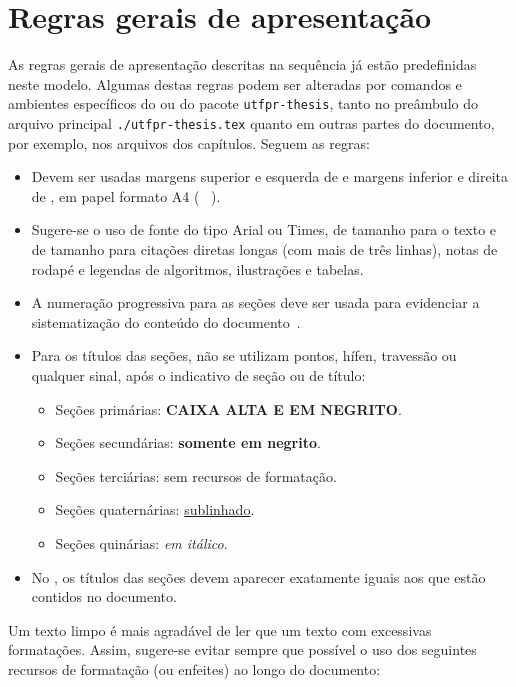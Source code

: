 \section{Regras gerais de apresentação}%
\label{sect:rules}

As regras gerais de apresentação descritas na sequência já estão predefinidas neste modelo.
Algumas destas regras podem ser alteradas por comandos e ambientes específicos do  ou do pacote \texttt{utfpr-thesis}, tanto no preâmbulo do arquivo principal \texttt{./utfpr-thesis.tex} quanto em outras partes do documento, por exemplo, nos arquivos dos capítulos\label{err:chpt-3}.
Seguem as regras:

\begin{itemize}
\item Devem ser usadas margens superior e esquerda de  e margens inferior e direita de , em papel formato A4 ( \texttimes\ ).
\item Sugere-se o uso de fonte do tipo Arial ou Times, de tamanho  para o texto e de tamanho  para citações diretas longas (com mais de três linhas), notas de rodapé e legendas de algoritmos, ilustrações e tabelas.
\item A numeração progressiva para as seções deve ser usada para evidenciar a sistematização do conteúdo do documento~\cite{ABNT2012NBR6024}.
\item Para os títulos das seções, não se utilizam pontos, hífen, travessão ou qualquer sinal, após o indicativo de seção ou de título:
\begin{itemize}
\item Seções primárias: \textbf{\MakeTextUppercase{caixa alta e em negrito}}.
\item Seções secundárias: \textbf{somente em negrito}.
\item Seções terciárias: sem recursos de formatação.
\item Seções quaternárias: \uline{sublinhado}.
\item Seções quinárias: \textit{em itálico}.
\end{itemize}
\item No \tocref, os títulos das seções devem aparecer exatamente iguais aos que estão contidos no documento.
\end{itemize}

Um texto limpo é mais agradável de ler que um texto com excessivas formatações.
Assim, sugere-se evitar sempre que possível o uso dos seguintes recursos de formatação (ou enfeites) ao longo do documento:

